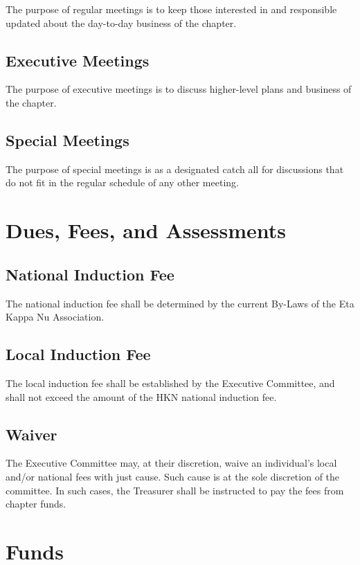 \documentclass[11pt]{article}
\begin{document}
The purpose of regular meetings is to keep those interested in and responsible updated about the day-to-day business of the chapter.

\subsection{Executive Meetings}
\label{sec:orgdc183f2}

The purpose of executive meetings is to discuss higher-level plans and business of the chapter.

\subsection{Special Meetings}
\label{sec:org9b3231a}

The purpose of special meetings is as a designated catch all for discussions that do not fit in the regular schedule of any other meeting.
\section{Dues, Fees, and Assessments}
\label{sec:org513defb}

\subsection{National Induction Fee}
\label{sec:org3bc6a2b}

The national induction fee shall be determined by the current By-Laws of the Eta Kappa Nu Association.

\subsection{Local Induction Fee}
\label{sec:org86b4192}

The local induction fee shall be established by the Executive Committee, and shall not exceed the amount of the HKN national induction fee.

\subsection{Waiver}
\label{sec:orgbcd0e3e}

The Executive Committee may, at their discretion, waive an individual’s local and/or national fees with just cause.
Such cause is at the sole discretion of the committee. In such cases, the Treasurer shall be instructed to pay the fees from chapter funds.
\section{Funds}
\label{sec:org8acd8d3}
\end{document}

